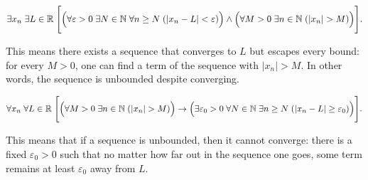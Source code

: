 \begin{remark*}
\[
\exists x_n \; \exists L \in \mathbb{R}\;
\Biggl[
\Bigl(
\forall \varepsilon > 0 \; \exists N \in \mathbb{N} \; \forall n \ge N \;
(|x_n - L| < \varepsilon)
\Bigr)
\land
\Bigl(
\forall M > 0 \; \exists n \in \mathbb{N} \; (|x_n| > M)
\Bigr)
\Biggr].
\]

This means there exists a sequence that converges to $L$ but escapes every bound: for every
$M > 0$, one can find a term of the sequence with $|x_n| > M$. In other words, the sequence
is unbounded despite converging.
\end{remark*}

\begin{remark*}
\[
\forall x_n \; \forall L \in \mathbb{R}\;
\Biggl[
\Bigl(
\forall M > 0 \; \exists n \in \mathbb{N} \; (|x_n| > M)
\Bigr)
\rightarrow
\Bigl(
\exists \varepsilon_0 > 0 \; \forall N \in \mathbb{N} \; \exists n \ge N \;
(|x_n - L| \ge \varepsilon_0)
\Bigr)
\Biggr].
\]

This means that if a sequence is unbounded, then it cannot converge: there is a fixed
$\varepsilon_0 > 0$ such that no matter how far out in the sequence one goes, some term
remains at least $\varepsilon_0$ away from $L$.
\end{remark*}
